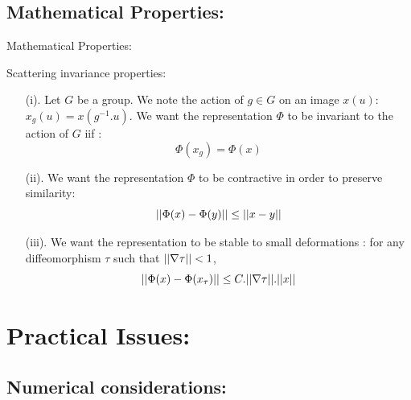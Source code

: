 \documentclass[9pt]{beamer}
\DeclarePairedDelimiter\norm{\vert\vert}{\vert\vert}
\begin{document}
\subsection[Properties]{Mathematical Properties:}
\begin{frame}{Mathematical Properties:}
	\begin{block}{Scattering invariance properties:}
		\begin{itemize}
			\item[(i).] Let $G$ be a group. We note the action of $g \in G $ on an image $x(u)$: $x_g(u) = x(g^{-1}.u)$. We want the representation $\Phi$ to be invariant to the action of $G$ \cite{sifre2013rotation} iif :
			\begin{equation}
				\Phi(x_g)=\Phi(x)
			\end{equation}
			\item[(ii).] We want the representation $\Phi$ to be contractive \cite{anden2014deep} in order to preserve similarity:
			\begin{equation}
				\norm*{\Phi(x)-\Phi(y)} \leq \norm*{x-y}
			\end{equation}
			\item[(iii).] We want the representation to be stable to small deformations \cite{mallat2012group}: for any diffeomorphism $\tau$ such that $ \norm*{\nabla \tau} < 1$, 
			\begin{equation}
				\norm*{\Phi(x) - \Phi(x_{\tau})} \leq C.\norm*{\nabla \tau}.\norm*{x}
			\end{equation}
		\end{itemize}
	\end{block}
\end{frame}

\section[Issues]{Practical Issues:}

\subsection[Numerical]{Numerical considerations:}
\end{document}

